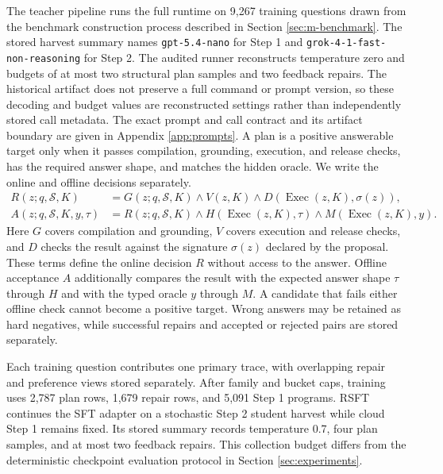 The teacher pipeline runs the full runtime on 9,267 training questions drawn from the benchmark
construction process described in Section \ref{sec:m-benchmark}.  The stored harvest summary names
\texttt{gpt-5.4-nano} for Step 1 and \texttt{grok-4-1-fast-non-reasoning} for Step 2.  The audited
runner reconstructs temperature zero and budgets of at most two structural plan samples and two
feedback repairs.  The historical artifact does not preserve a full command or prompt version, so
these decoding and budget values are reconstructed settings rather than independently stored call
metadata.  The exact prompt and call contract and its artifact boundary are given in Appendix
\ref{app:prompts}.  A
plan is a positive answerable target only when it passes compilation, grounding, execution, and release
checks, has the required answer shape, and matches the hidden oracle.  We write the online and
offline decisions separately.
\begin{equation}
\begin{aligned}
 R(z;q,\mathcal{S},K) &= G(z;q,\mathcal{S},K)\land V(z,K)
 \land D(\operatorname{Exec}(z,K),\sigma(z)), \\
 A(z;q,\mathcal{S},K,y,\tau) &= R(z;q,\mathcal{S},K)
 \land H(\operatorname{Exec}(z,K),\tau)
 \land M(\operatorname{Exec}(z,K),y).
\end{aligned}
\label{eq:acceptance}
\end{equation}
Here $G$ covers compilation and grounding, $V$ covers execution and release checks, and $D$ checks
the result against the signature $\sigma(z)$ declared by the proposal.  These terms define the
online decision $R$ without access to the answer.  Offline acceptance $A$ additionally compares the
result with the expected answer shape $\tau$ through $H$ and with the typed oracle $y$ through $M$.
A candidate that fails either offline check cannot become a positive target.  Wrong answers may be
retained as hard negatives, while successful repairs and accepted or rejected pairs are stored
separately.

Each training question contributes one primary trace, with overlapping repair and preference views
stored separately.  After family and bucket caps, training uses 2,787 plan rows, 1,679 repair rows,
and 5,091 Step 1 programs.  RSFT continues the SFT adapter on a stochastic Step 2 student harvest
while cloud Step 1 remains fixed.  Its stored summary records temperature 0.7, four plan samples,
and at most two feedback repairs.  This collection budget differs from the deterministic checkpoint
evaluation protocol in Section \ref{sec:experiments}.

